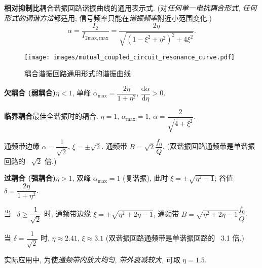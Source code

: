 \textbf{相对抑制比}\quad 耦合谐振回路谐振曲线的通用表示式. (对\textit{任何单一电抗耦合形式}, \textit{任何形式的调谐方法}都适用; 信号频率只能在\textit{谐振频率}附近小范围变化.)
\begin{equation}
    \alpha=\frac{I_2}{I_{2\mathrm{max,max}}}=\frac{2\eta}{\sqrt{(1-\xi^2+\eta^2)^2+4\xi^2}}.
\end{equation}

\begin{figure}[H]
    \centering
    \texttt{[image: images/mutual\_coupled\_circuit\_resonance\_curve.pdf]}
    \caption{耦合谐振回路通用形式的谐振曲线}
\end{figure}

\textbf{欠耦合 (弱耦合)}\quad $\eta<1$, 单峰 $\alpha_\mathrm{max}=\dfrac{2\eta}{1+\eta^2}$, $\dfrac{\mathrm{d}\alpha}{\mathrm{d}\eta}>0$.

\textbf{临界耦合}\quad 最佳全谐振时的耦合. $\eta=1$, $\alpha_\mathrm{max}=1$, $\alpha=\dfrac{2}{\sqrt{4+\xi^2}}$.

通频带边缘 $\alpha=\dfrac{1}{\sqrt{2}}$, $\xi=\pm\sqrt{2}$. 通频带 $B=\sqrt{2}\dfrac{f_0}{Q}$. (双谐振回路通频带是单谐振回路的\ {\color{red} $\sqrt{2}$} 倍.)

\textbf{过耦合 (强耦合)}\quad $\eta>1$, 双峰 $\alpha_\mathrm{max}=1$ (复谐振), 此时 $\xi=\pm\sqrt{\eta^2-1}$; 谷值 $\delta=\dfrac{2\eta}{1+\eta^2}$.

当\ {\color{red} $\delta\geq\dfrac{1}{\sqrt{2}}$} 时, 通频带边缘 $\xi=\pm\sqrt{\eta^2+2\eta-1}$, 通频带 $B=\sqrt{\eta^2+2\eta-1}\dfrac{f_0}{Q}$.

当 $\delta=\dfrac{1}{\sqrt{2}}$ 时, $\eta\approx 2.41$, $\xi\approx 3.1$ (双谐振回路通频带是单谐振回路的\ {\color{red} 3.1} 倍.)

实际应用中, 为使\textit{通频带内放大均匀}, \textit{带外衰减较大}, 可取 $\eta=1.5$.
